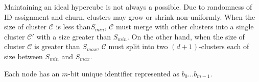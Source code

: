 \documentclass[apa6]{IEEEtran}
\theoremstyle{plain}
\begin{document}
			Maintaining an ideal hypercube is not always a possible. Due to randomness of ID assignment and churn, clusters may grow or shrink non-uniformly.
			When the size of cluster $\mathcal{C}$ is less than$S_{min}$, 
			$\mathcal{C}$ must merge with other clusters into a single cluster $\mathcal{C'}$ with a size greater than $S_{min}$.
			On the other hand, when the size of cluster $\mathcal{C}$ is greater than $S_{max}$, 
			$\mathcal{C}$ must split into two $(d+1)$-clusters each of size between $S_{min}$ and $S_{max}$.
			
			\vspace{1em}
			



			
			

				
				
				

		Each node has an $m$-bit unique identifier represented as $b_0...b_{m-1}.$
		
		
		
		
		
\end{document}
